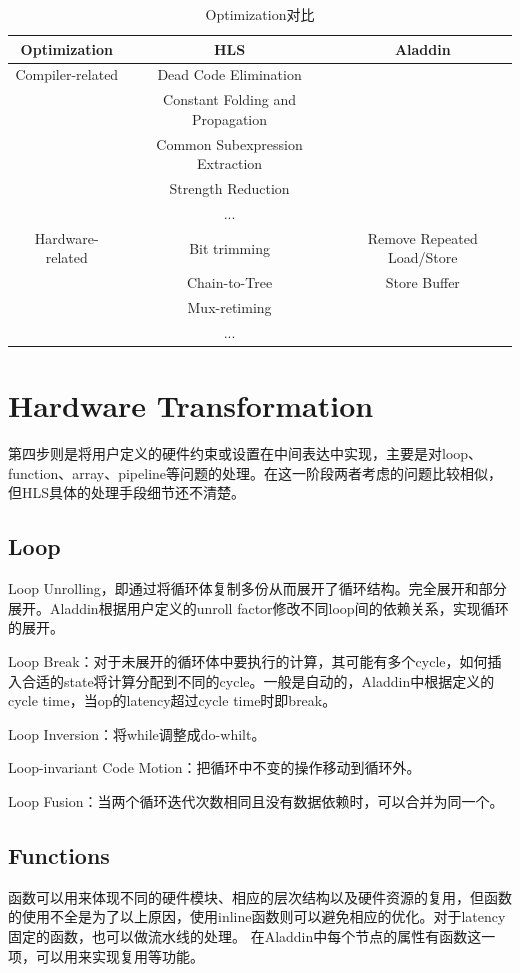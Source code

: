 \documentclass[UTF8]{scrartcl}
\begin{document}
			\begin{table}[h]
				\centering
				\caption{Optimization对比}
				\begin{tabular*}{16cm}{c |c|c }
					\hline
					Optimization  &  HLS  & Aladdin   \\
					\hline
					Compiler-related & Dead Code Elimination &  \\
					&Constant Folding and Propagation& \\
					&Common Subexpression Extraction&\\
					&Strength Reduction&\\
					&...&\\
					\hline
					Hardware-related&Bit trimming&Remove Repeated Load/Store\\
					&Chain-to-Tree&Store Buffer\\
					&Mux-retiming&\\
					&...&\\
					\hline
				\end{tabular*}	
			\end{table}

\section{Hardware Transformation}
	第四步则是将用户定义的硬件约束或设置在中间表达中实现，主要是对loop、function、array、pipeline等问题的处理。在这一阶段两者考虑的问题比较相似，但HLS具体的处理手段细节还不清楚。
	\subsection{Loop}
		Loop Unrolling，即通过将循环体复制多份从而展开了循环结构。完全展开和部分展开。Aladdin根据用户定义的unroll factor修改不同loop间的依赖关系，实现循环的展开。
		
		Loop Break：对于未展开的循环体中要执行的计算，其可能有多个cycle，如何插入合适的state将计算分配到不同的cycle。一般是自动的，Aladdin中根据定义的cycle time，当op的latency超过cycle time时即break。
		
		Loop Inversion：将while调整成do-whilt。
		
		Loop-invariant Code Motion：把循环中不变的操作移动到循环外。
		
		Loop Fusion：当两个循环迭代次数相同且没有数据依赖时，可以合并为同一个。
	\subsection{Functions}
		函数可以用来体现不同的硬件模块、相应的层次结构以及硬件资源的复用，但函数的使用不全是为了以上原因，使用inline函数则可以避免相应的优化。对于latency固定的函数，也可以做流水线的处理。 
		在Aladdin中每个节点的属性有函数这一项，可以用来实现复用等功能。
\end{document}
